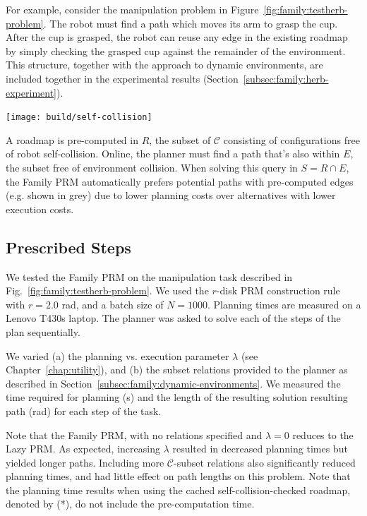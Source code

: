 For example,
consider the manipulation problem in
Figure~\ref{fig:family:testherb-problem}.
The robot must find a path which moves its arm to grasp the cup.
After the cup is grasped,
the robot can reuse any edge in the existing roadmap
by simply checking the grasped cup
against the remainder of the environment.
This structure,
together with the approach to dynamic environments,
are included together in the experimental results
(Section~\ref{subsec:family:herb-experiment}).

\begin{marginfigure}
   \centering
   \texttt{[image: build/self-collision]}
   \caption{A roadmap is pre-computed in $R$,
      the subset of $\mathcal{C}$ consisting of configurations free
      of robot self-collision.
      Online, the planner must find a path that's also within $E$,
      the subset free of environment collision.
      When solving this query in $S = R \cap E$,
      the Family PRM automatically prefers potential paths with
      pre-computed edges (e.g. shown in grey)
      due to lower planning costs over alternatives with lower
      execution costs.}
   \label{fig:family:self-collision-example}
\end{marginfigure}

\subsection{Prescribed Steps}

We tested the Family PRM on the manipulation task
described in Fig.~\ref{fig:family:testherb-problem}.
We used the $r$-disk PRM construction rule with $r=2.0$ rad,
and a batch size of $N=1000$.
Planning times are measured on a Lenovo T430s laptop.
The planner was asked to solve each of the steps of the plan
sequentially.

We varied
(a) the planning vs. execution parameter $\lambda$
(see Chapter~\ref{chap:utility}), and
(b) the subset relations provided to the planner
as described in Section~\ref{subsec:family:dynamic-environments}.
We measured the time required for planning (s)
and the length of the resulting solution resulting path (rad)
for each step of the task.

Note that the Family PRM,
with no relations specified and $\lambda=0$
reduces to the Lazy PRM.
As expected,
increasing $\lambda$ resulted in decreased planning times
but yielded longer paths.
Including more $\mathcal{C}$-subset relations
also significantly reduced planning times,
and had little effect on path lengths on this problem.
Note that the planning time results when using
the cached self-collision-checked roadmap, denoted by (*),
do not include the pre-computation time.

